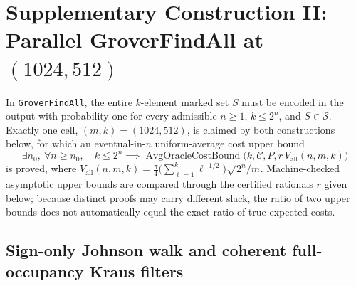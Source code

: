 \documentclass[11pt,a4paper]{article}
\theoremstyle{definition}
\theoremstyle{remark}
\begin{document}
\section{Supplementary Construction II: Parallel GroverFindAll at \texorpdfstring{\((1024,512)\)}{(1024,512)}}
\label{sec:findall}

In \texttt{GroverFindAll}, the entire \(k\)-element marked set \(S\) must be encoded in the output with probability one for every admissible \(n \ge 1\), \(k \le 2^n\), and \(S \in \mathcal{S}\). Exactly one cell, \((m,k) = (1024,512)\), is claimed by both constructions below, for which an eventual-in-\(n\) uniform-average cost upper bound
\[
  \exists n_0,\ \forall n \ge n_0,\quad k \le 2^n \implies
  \operatorname{AvgOracleCostBound}\bigl(k, \mathcal{C}, P, r\,V_{\mathrm{all}}(n,m,k)\bigr)
\]
is proved, where \(V_{\mathrm{all}}(n,m,k) = \frac{\pi}{4}\bigl(\sum_{\ell=1}^k \ell^{-1/2}\bigr)\sqrt{2^n/m}\). Machine-checked asymptotic upper bounds are compared through the certified rationals \(r\) given below; because distinct proofs may carry different slack, the ratio of two upper bounds does not automatically equal the exact ratio of true expected costs.

\subsection{Sign-only Johnson walk and coherent full-occupancy Kraus filters}
\end{document}
